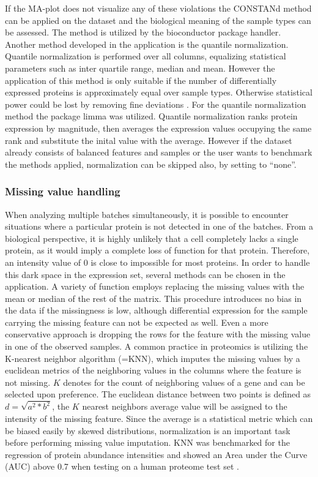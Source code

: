 \documentclass[
  11pt,
]{article}
\begin{document}
If the MA-plot does not visualize any of these violations the CONSTANd
method can be applied on the dataset and the biological meaning of the
sample types can be assessed. The method is utilized by the bioconductor
package handler. Another method developed in the application is the
quantile normalization. Quantile normalization is performed over all
columns, equalizing statistical parameters such as inter quartile range,
median and mean. However the application of this method is only suitable
if the number of differentially expressed proteins is approximately
equal over sample types. Otherwise statistical power could be lost by
removing fine deviations \citep{Zhao2020}. For the quantile
normalization method the package limma was utilized. Quantile
normalization ranks protein expression by magnitude, then averages the
expression values occupying the same rank and substitute the inital
value with the average. However if the dataset already consists of
balanced features and samples or the user wants to benchmark the methods
applied, normalization can be skipped also, by setting to ``none''.

\hypertarget{missing-value-handling}{%
\subsubsection{Missing value handling}\label{missing-value-handling}}

When analyzing multiple batches simultaneously, it is possible to
encounter situations where a particular protein is not detected in one
of the batches. From a biological perspective, it is highly unlikely
that a cell completely lacks a single protein, as it would imply a
complete loss of function for that protein. Therefore, an intensity
value of 0 is close to impossible for most proteins. In order to handle
this dark space in the expression set, several methods can be chosen in
the application. A variety of function employs replacing the missing
values with the mean or median of the rest of the matrix. This procedure
introduces no bias in the data if the missingness is low, although
differential expression for the sample carrying the missing feature can
not be expected as well. Even a more conservative approach is dropping
the rows for the feature with the missing value in one of the observed
samples. A common practice in proteomics is utilizing the K-nearest
neighbor algorithm (=KNN), which imputes the missing values by a
euclidean metrics of the neighboring values in the columns where the
feature is not missing. \(K\) denotes for the count of neighboring
values of a gene and can be selected upon preference. The euclidean
distance between two points is defined as \(d = \sqrt{a^2 * b^2}\), the
\(K\) nearest neighbors average value will be assigned to the intensity
of the missing feature. Since the average is a statistical metric which
can be biased easily by skewed distributions, normalization is an
important task before performing missing value imputation. KNN was
benchmarked for the regression of protein abundance intensities and
showed an Area under the Curve (AUC) above 0.7 when testing on a human
proteome test set \citep{Lan2013}.
\end{document}
